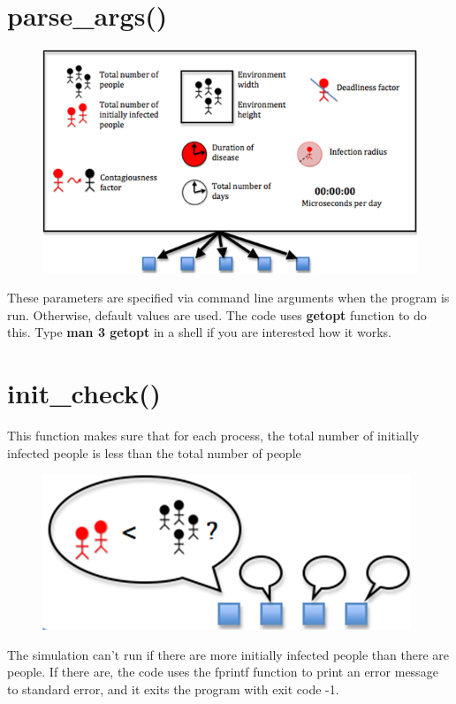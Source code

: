 \documentclass[letterpaper,10pt,openany,oneside]{sphinxmanual}
\begin{document}
\section{parse\_args()}
\label{3-Initialize/initialize:parse-args}\begin{figure}[htbp]
\centering

\includegraphics{img-6.png}
\end{figure}

These parameters are specified via command line arguments when the program is run. Otherwise, default values are used. The code uses \textbf{getopt} function to do this. Type \textbf{man 3 getopt} in a shell if you are interested how it works.


\section{init\_check()}
\label{3-Initialize/initialize:init-check}
This function makes sure that for each process, the total number of initially infected people is less than the total number of people
\begin{figure}[htbp]
\centering

\includegraphics{img-7.png}
\end{figure}

The simulation can’t run if there are more initially infected people than there are people. If there are, the code uses the fprintf function to print an error message to standard error, and it exits the program with exit code -1.
\end{document}
